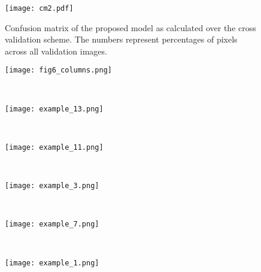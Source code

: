 \documentclass[journal]{IEEEtran}
\begin{document}
\begin{figure}
    \centering
    \texttt{[image: cm2.pdf]}
    \caption{Confusion matrix of the proposed model as calculated over the cross validation scheme. The numbers represent percentages of pixels across all validation images.}
    \label{fig:cm}
\end{figure}\begin{figure*}
    \centering
    \begin{subfigure}[b]{1\textwidth}
    	\centering
        \texttt{[image: fig6\_columns.png]}
    \end{subfigure}
    ~
    ~

    \begin{subfigure}[b]{1\textwidth}
    	\centering
        \texttt{[image: example\_13.png]}
    \end{subfigure}
    ~
    
    \begin{subfigure}[b]{1\textwidth}
    	\centering
        \texttt{[image: example\_11.png]}
    \end{subfigure}
    ~
    
    \begin{subfigure}[b]{1\textwidth}
    	\centering
        \texttt{[image: example\_3.png]}
    \end{subfigure}
    ~
    
    \begin{subfigure}[b]{1\textwidth}
    	\centering
        \texttt{[image: example\_7.png]}
    \end{subfigure}
    ~
    
    \begin{subfigure}[b]{1\textwidth}
    	\centering
        \texttt{[image: example\_1.png]}
    \end{subfigure}
    ~


\end{figure*}
\end{document}
